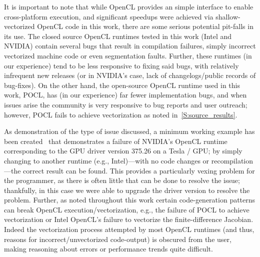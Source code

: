 \documentclass[12pt,number,sort&compress,preprint]{elsarticle}
\begin{document}
It is important to note that while OpenCL provides an simple interface to enable cross-platform execution, and significant speedups were achieved via shallow-vectorized OpenCL code in this work, there are some serious potential pit-falls in its use.
The closed source OpenCL runtimes tested in this work (Intel and NVIDIA) contain several bugs that result in compilation failures, simply incorrect vectorized machine code or even segmentation faults.
Further, these runtimes (in our experience) tend to be less responsive to fixing said bugs, with relatively infrequent new releases (or in NVIDIA's case, lack of changelogs\slash public records of bug-fixes).
On the other hand, the open-source OpenCL runtime used in this work, POCL, has (in our experience) far fewer implementation bugs, and when issues arise the community is very responsive to bug reports and user outreach; however, POCL fails to achieve vectorization as noted in~\cref{S:source_results}.

As demonstration of the type of issue discussed, a minimum working example has been created~\cite{nvidia_mwe} that demonstrates a failure of NVIDIA's OpenCL runtime corresponding to the GPU driver version \num{375.26} on a Tesla \gpunew/ GPU; by simply changing to another runtime (e.g., Intel)---with no code changes or recompilation---the correct result can be found.
This provides a particularly vexing problem for the programmer, as there is often little that can be done to resolve the issue; thankfully, in this case we were able to upgrade the driver version to resolve the problem.
Further, as noted throughout this work certain code-generation patterns can break OpenCL execution\slash vectorization, e.g., the failure of POCL to achieve vectorization or Intel OpenCL's failure to vectorize the finite-difference Jacobian.
Indeed the vectorization process attempted by most OpenCL runtimes (and thus, reasons for incorrect\slash unvectorized code-output) is obscured from the user, making reasoning about errors or performance trends quite difficult.
\end{document}
